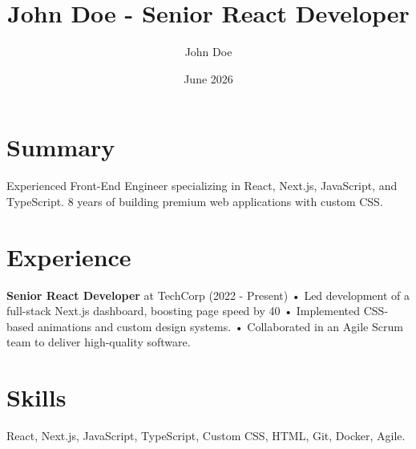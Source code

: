 \documentclass{article}
\begin{document}
\title{John Doe - Senior React Developer}
\author{John Doe}
\date{June 2026}

\section{Summary}
Experienced Front-End Engineer specializing in React, Next.js, JavaScript, and TypeScript. 8 years of building premium web applications with custom CSS.

\section{Experience}
\textbf{Senior React Developer} at TechCorp (2022 - Present)
• Led development of a full-stack Next.js dashboard, boosting page speed by 40%
• Implemented CSS-based animations and custom design systems.
• Collaborated in an Agile Scrum team to deliver high-quality software.

\section{Skills}
React, Next.js, JavaScript, TypeScript, Custom CSS, HTML, Git, Docker, Agile.
\end{document}

